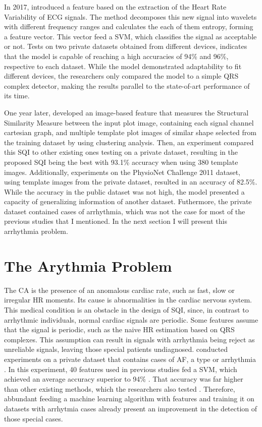 In 2017, \citeauthor{review-3} introduced a feature based on the extraction of the Heart Rate Variability of \acrshort{ECG} signals. The method decomposes this new signal into wavelets with different frequency ranges and calculates the each of them entropy, forming a feature vector. This vector feed a \acrshort{SVM}, which classifies the signal as acceptable or not. Tests on two private datasets obtained from different devices, indicates that the model is capable of reaching a high accuracies of 94\% and 96\%, respective to each dataset. While the model demonstrated adaptability to fit different devices, the researchers only compared the model to a simple QRS complex detector, making the results parallel to the state-of-art performance of its time.
	
One year later, \citeauthor{review-4} developed an image-based feature that measures the Structural Similarity Measure between the input plot image, containing each signal channel cartesian graph, and multiple template plot images of similar shape selected from the training dataset by using clustering analysis. Then, an experiment compared this \acrshort{SQI} to other existing ones testing on a private dataset, resulting in the proposed \acrshort{SQI} being the best with 93.1\% accuracy when using 380 template images. Additionally, experiments on the PhysioNet Challenge 2011 dataset, using template images from the private dataset, resulted in an accuracy of  82.5\%. While the accuracy in the public dataset was not high, the model presented a capacity of generalizing information of another dataset. Futhermore, the private dataset contained cases of arrhythmia, which was not the case for most of the previous studies that I mentioned. In the next section I will present this arrhythmia problem.  

\section{The Arythmia Problem}
\label{sec:arythmia}

The \acrfull{CA} is the presence of an anomalous cardiac rate, such as fast, slow or irregular \acrshort{HR} moments. Its cause is abnormalities in the cardiac nervous system. This medical condition is an obstacle in the design of \acrshort{SQI}, since, in contrast to arrhythmic individuals, normal cardiac signals are periodic. Some features assume that the signal is periodic, such as the naive \acrshort{HR} estimation based on QRS complexes. This assumption can result in signals with arrhythmia being reject as unreliable signals, leaving those special patients undiagnosed. \citeauthor{review-5} conducted experiments on a private dataset that contains cases of \acrfull{AF}, a type or arrhythmia \cite{review-5}. In this experiment, 40 features used in previous studies fed a \acrshort{SVM}, which achieved an average accuracy superior to 94\% \cite{review-5}. That accuracy was far higher than other existing methods, which the researchers also tested \cite{review-5}. Therefore, abbundant feeding a machine learning algorithm with features and training it on datasets with arrhytmia cases already present an improvement in the detection of those special cases.

